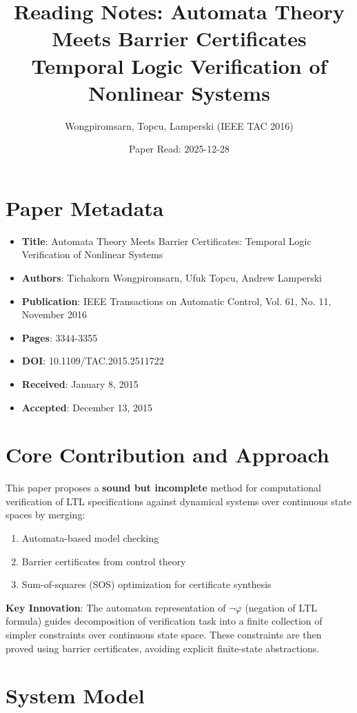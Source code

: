 \documentclass{article}
\title{Reading Notes: Automata Theory Meets Barrier Certificates\\
Temporal Logic Verification of Nonlinear Systems}
\author{Wongpiromsarn, Topcu, Lamperski (IEEE TAC 2016)}
\date{Paper Read: 2025-12-28}
\begin{document}
\maketitle

\section{Paper Metadata}

\begin{itemize}
    \item \textbf{Title}: Automata Theory Meets Barrier Certificates: Temporal Logic Verification of Nonlinear Systems
    \item \textbf{Authors}: Tichakorn Wongpiromsarn, Ufuk Topcu, Andrew Lamperski
    \item \textbf{Publication}: IEEE Transactions on Automatic Control, Vol. 61, No. 11, November 2016
    \item \textbf{Pages}: 3344-3355
    \item \textbf{DOI}: 10.1109/TAC.2015.2511722
    \item \textbf{Received}: January 8, 2015
    \item \textbf{Accepted}: December 13, 2015
\end{itemize}

\section{Core Contribution and Approach}

This paper proposes a \textbf{sound but incomplete} method for computational verification of LTL specifications against dynamical systems over continuous state spaces by merging:
\begin{enumerate}
    \item Automata-based model checking
    \item Barrier certificates from control theory
    \item Sum-of-squares (SOS) optimization for certificate synthesis
\end{enumerate}

\textbf{Key Innovation}: The automaton representation of $\neg\varphi$ (negation of LTL formula) guides decomposition of verification task into a finite collection of simpler constraints over continuous state space. These constraints are then proved using barrier certificates, avoiding explicit finite-state abstractions.

\section{System Model}
\end{document}
